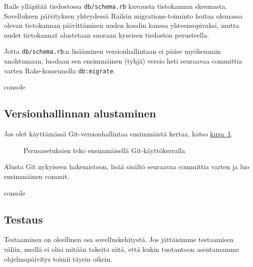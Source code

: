 \documentclass{article}
\newenvironment{myfigure}[1][tbp]{
  \begin{figure}[#1]
    \centering
    \begin{lrbox}{\myfigurebox}
      \begin{minipage}{\textwidth}
}{
      \end{minipage}
    \end{lrbox}
    \colorbox{blue!4}{\usebox{\myfigurebox}}
  \end{figure}
}
\newcommand{\myref}[2]{\hyperref[#2]{#1~\ref*{#2}}}
\begin{document}
Rails ylläpitää tiedostossa \texttt{db/schema.rb} kuvausta tietokannan
skeemasta. Sovelluksen päivityksen yhteydessä Railsin migrations-toiminto
hoitaa olemassa olevan tietokannan päivittämisen uuden koodin kanssa
yhteensopivaksi, mutta uudet tietokannat alustetaan suoraan kyseisen tiedoston
perusteella.

\begin{samepage}
Jotta \texttt{db/schema.rb}:n lisääminen versionhallintaan ei pääse myöhemmin
unohtumaan, luodaan sen ensimmäinen (tyhjä) versio heti seuraavaa committia
varten Rake-komennolla \texttt{db:migrate}.

\begin{pygmented}{console}
\end{pygmented}
\end{samepage}

\subsection{Versionhallinnan alustaminen}

Jos olet käyttämässä Git-versionhallintaa ensimmäistä kertaa, katso
\myref{kuva}{fig:git-initial-config}.

\begin{myfigure}
\caption{Perusasetuksien teko ensimmäisellä Git-käyttökerralla}
\label{fig:git-initial-config}

\end{myfigure}

\begin{samepage}
Alusta Git nykyiseen hakemistoon, lisää sisältö seuraavaa committia varten ja
luo ensimmäinen commit.

\begin{pygmented}{console}
\end{pygmented}
\end{samepage}

\subsection{Testaus}

Testaaminen on oleellinen osa sovelluskehitystä. Jos jättäisimme testaamisen
väliin, meillä ei olisi mitään takeita siitä, että kukin tuotantoon asentamamme
ohjelmapäivitys toimii täysin oikein.
\end{document}
